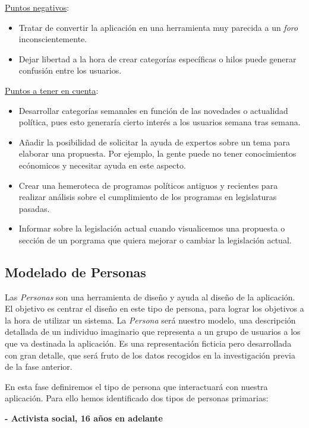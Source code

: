 \underline{Puntos negativos}:

\begin{itemize}
  \item Tratar de convertir la aplicación en una herramienta muy parecida a un \textit{foro} inconscientemente.
  \item Dejar libertad a la hora de crear categorías específicas o hilos puede generar confusión entre los usuarios. 
\end{itemize}

\underline{Puntos a tener en cuenta}:

\begin{itemize}
  \item Desarrollar categorías semanales en función de las novedades o actualidad política, pues esto generaría cierto interés a los usuarios semana tras semana.
  \item Añadir la posibilidad de solicitar la ayuda de expertos sobre un tema para elaborar una propuesta. Por ejemplo, la gente puede no tener conocimientos ecónomicos y necesitar ayuda en este aspecto.
  \item Crear una hemeroteca de programas políticos antiguos y recientes para realizar análisis sobre el cumplimiento de los programas en legislaturas pasadas.
  \item Informar sobre la legislación actual cuando visualicemos una propuesta o sección de un porgrama que quiera mejorar o cambiar la legislación actual.
\end{itemize}

\subsection{Modelado de Personas}

Las \textit{Personas} son una herramienta de diseño y ayuda al diseño de la aplicación. El objetivo es centrar el diseño en este tipo de persona, para lograr los objetivos a la hora de utilizar un sistema. La \textit{Persona} será nuestro modelo, una descripción detallada de un individuo imaginario que representa a un grupo de usuarios a los que va destinada la aplicación. Es una representación ficticia pero desarrollada con gran detalle, que será fruto de los datos recogidos en la investigación previa de la fase anterior.

En esta fase definiremos el tipo de persona que interactuará con nuestra aplicación. Para ello hemos identificado dos tipos de personas primarias:

\textbf{- Activista social, 16 años en adelante}


